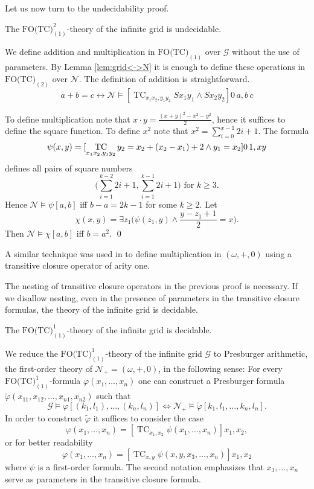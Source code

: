 \documentclass{LMCS}
\renewcommand{\phi}{\varphi}
\DeclareMathOperator{\TC}{TC}
\begin{document}
Let us now turn to the undecidability proof.

\begin{thm}
The $\textrm{FO(TC)}_{(1)}^2$-theory of the infinite grid is undecidable.
\end{thm}
\proof 
We define addition and multiplication in $\textrm{FO(TC)}_{(1)}$ over $\mathcal G$
without the use of parameters. By Lemma \ref{lem:grid<->N} it 
is enough to  define these operations in $\textrm{FO(TC)}_{(2)}$ over 
$\mathcal N$. The definition of addition is straightforward.
\[a+b=c  \leftrightarrow  \mathcal N \models [\TC_{x_1x_2,y_1 y_2} S x_1 y_1 \wedge S x_2 y_2] 0\,a, b\,c \]

To define multiplication note that $x \cdot y = \frac{(x+y)^2-x^2-y^2}{2}$,
hence it suffices to define the square function.  To define $x^2$ note that 
$x^2 = \sum_{i=0}^{x-1} 2i+1$. The formula
\[
\psi(x,y) =  [\TC_{x_1x_2,y_1 y_2} y_2=x_2+(x_2-x_1)+2 \\ 
 \wedge y_1=x_2]0\,1,xy
\]
defines all pairs of square numbers 
\[\big(\sum_{i=1}^{k-2} 2i+1, \sum_{i=1}^{k-1} 2i+1 \big) \text{ for } k \ge 3.\]
Hence $\mathcal N \models \psi[a,b]$ iff $b-a=2k-1$ for some $k \ge 2$.
Let 
\[\chi(x,y)= \exists z_1 \Big( \psi(z_1,y) \wedge \frac{y-z_1+1}{2}=x \Big).\]
Then $\mathcal N \models \chi[a,b]$ iff $b=a^2$.
\qed

A similar technique was used in \cite{av03} to define multiplication in $(\omega, +,0)$
using a transitive closure operator of arity one.

The nesting of transitive closure operators in the previous proof is necessary. If
we disallow nesting, even in the presence of parameters in the transitive closure 
formulas, the theory of the infinite grid is decidable.

\begin{thm}
The  $\textrm{FO(TC)}_{(1)}^1$-theory of the infinite grid is decidable.
\end{thm}
\proof
We reduce the $\textrm{FO(TC)}_{(1)}^1$-theory of the infinite grid $\mathcal G$ 
to Presburger arithmetic, the first-order theory of $\mathcal N_+ = (\omega, +, 0)$, in
the following sense: For every $\textrm{FO(TC)}_{(1)}^1$-formula $\phi(x_1,\ldots,x_n)$
one can construct  a Presburger formula $\tilde\phi(x_{11},x_{12},\ldots,x_{n1},x_{n2})$ such that
\begin{equation}\label{eq:fotc-grid-dec-1}
\mathcal G \models \phi[(k_1,l_1),\ldots,(k_n,l_n)] \Leftrightarrow \mathcal N_+ \models
\tilde \phi[k_1,l_1,\ldots,k_n,l_n].
\end{equation}
In order to construct $\tilde\phi$ it suffices to consider the case 
\[\phi(x_1,\ldots,x_n) =[\TC_{x_1,x_2} \psi(x_1,\ldots,x_n)]x_1,x_2,\] 
or for better readability 
\[\phi(x_1,\ldots,x_n) =[\TC_{x,y} \psi(x,y,x_3,\ldots,x_n)]x_1,x_2\] where $\psi$ is a 
first-order formula. The second notation emphasizes that $x_3,\ldots,x_n$ serve as 
parameters in the transitive closure formula.
\end{document}
